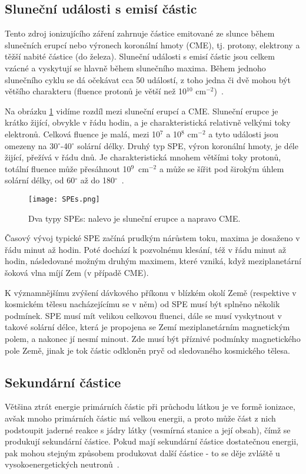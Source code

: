 \subsection{Sluneční události s emisí částic}
Tento zdroj ionizujícího záření zahrnuje částice emitované ze slunce během slunečních erupcí nebo výronech koronální hmoty (CME), tj. protony, elektrony a těžší nabité částice (do železa). Sluneční události s emisí částic jsou celkem vzácné a vyskytují se hlavně během slunečního maxima. Během jednoho slunečního cyklu se dá očekávat cca 50 událostí, z toho jedna či dvě mohou být většího charakteru (fluence protonů je větší než 10$^{10}$ cm$^{-2}$)~\cite{benton}.

Na obrázku \ref{fig:SPEs} vidíme rozdíl mezi sluneční erupcí a CME. Sluneční erupce je krátko žijící, obvykle v řádu hodin, a je charakteristická relativně velkými toky elektronů. Celková fluence je malá, mezi 10$^7$ a 10$^8$ cm$^{-2}$ a tyto události jsou omezeny na 30$^\circ$-40$^\circ$ solární délky. Druhý typ SPE, výron koronální hmoty, je déle žijící, přežívá v řádu dnů. Je charakteristická mnohem většími toky protonů, totální fluence může přesáhnout 10$^9$~cm$^{-2}$ a může se šířit pod širokým úhlem solární délky, od 60$^\circ$ až do 180$^\circ$~\cite{benton}.

\begin{figure}[H]
  \centering
  \texttt{[image: SPEs.png]}
  \caption{Dva typy SPEs: nalevo je sluneční erupce a napravo CME. \cite{benton}}
  \label{fig:SPEs}
\end{figure}

Časový vývoj typické SPE začíná prudkým nárůstem toku, maxima je dosaženo v řádu minut až hodin. Poté dochází k pozvolnému klesání, též v řádu minut až hodin, následované možným druhým maximem, které vzniká, když meziplanetární šoková vlna míjí Zem (v případě CME).

K významnějšímu zvýšení dávkového příkonu v blízkém okolí Země (respektive v kosmickém tělesu nacházejícímu se v něm) od SPE musí být splněno několik podmínek. SPE musí mít velikou celkovou fluenci, dále se musí vyskytnout v takové solární délce, která je propojena se Zemí meziplanetárním magnetickým polem, a nakonec jí nesmí minout. Zde musí být příznivé podmínky magnetického pole Země, jinak je tok částic odkloněn pryč od sledovaného kosmického tělesa. 
\subsection{Sekundární částice}
Většina ztrát energie primárních částic při průchodu látkou je ve formě ionizace, avšak mnoho primárních částic má velkou energii, a proto může část z nich podstoupit jaderné reakce s jádry látky (vesmírná stanice a její obsah), čímž se produkují sekundární částice. Pokud mají sekundární částice dostatečnou energii, pak mohou stejným způsobem produkovat další částice - to se děje zvláště u vysokoenergetických neutronů~\cite{benton}.

